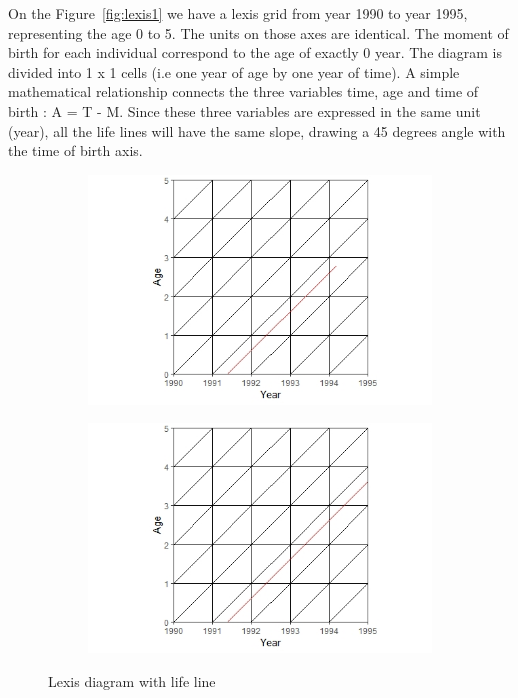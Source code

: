 On the  Figure~\ref{fig:lexis1} we have a lexis grid from year 1990 to year 1995, representing the age 0 to 5.
The units on those axes are identical. The moment of birth for each individual correspond to the age of exactly 0 year. The diagram is divided into 1 x 1 cells (i.e one year of age by one year of time). 
A simple mathematical relationship connects the three variables time, age and time of birth : A = T - M. Since these three variables are expressed in the same unit (year), all the life lines will have the same slope, drawing a 45 degrees angle with the time of birth axis.    
    
       
        \begin{figure}[tbh]
        \centering
        \begin{subfigure}{.5\textwidth}
          \centering
          \includegraphics[width=1\linewidth]{figures/lexis_plot3.jpeg}
          \caption{}
        \end{subfigure}%
        \begin{subfigure}{.5\textwidth}
          \centering
          \includegraphics[width=1\linewidth]{figures/lexis_plot4.jpeg}
          \caption{}
        \end{subfigure}
        \caption{Lexis diagram with life line}
        \label{fig:lexis 2}
        \end{figure}

